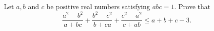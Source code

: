 Let $a,b$ and $c$ be positive real numbers satisfying $abc=1.$  Prove that$$\frac{a^2-b^2}{a+bc}+\frac{b^2-c^2}{b+ca}+\frac{c^2-a^2}{c+ab}\leq a+b+c-3.$$